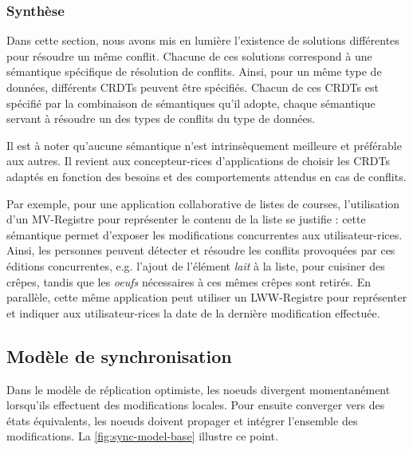 \documentclass[12pt]{thesul}
\newcommand{\eg}{e.g. }
\begin{document}
\subsubsection{Synthèse}

Dans cette section, nous avons mis en lumière l'existence de solutions différentes pour résoudre un même conflit.
Chacune de ces solutions correspond à une sémantique spécifique de résolution de conflits.
Ainsi, pour un même type de données, différents \acp{CRDT} peuvent être spécifiés.
Chacun de ces \acp{CRDT} est spécifié par la combinaison de sémantiques qu'il adopte, chaque sémantique servant à résoudre un des types de conflits du type de données.

Il est à noter qu'aucune sémantique n'est intrinsèquement meilleure et préférable aux autres.
Il revient aux concepteur-rices d'applications de choisir les \acp{CRDT} adaptés en fonction des besoins et des comportements attendus en cas de conflits.

Par exemple, pour une application collaborative de listes de courses, l'utilisation d'un \ac{MV}-Registre pour représenter le contenu de la liste se justifie : cette sémantique permet d'exposer les modifications concurrentes aux utilisateur-rices.
Ainsi, les personnes peuvent détecter et résoudre les conflits provoquées par ces éditions concurrentes, \eg l'ajout de l'élément \emph{lait} à la liste, pour cuisiner des crêpes, tandis que les \emph{oeufs} nécessaires à ces mêmes crêpes sont retirés.
En parallèle, cette même application peut utiliser un \ac{LWW}-Registre pour représenter et indiquer aux utilisateur-rices la date de la dernière modification effectuée.

\subsection{Modèle de synchronisation}

Dans le modèle de réplication optimiste, les noeuds divergent momentanément lorsqu'ils effectuent des modifications locales.
Pour ensuite converger vers des états équivalents, les noeuds doivent propager et intégrer l'ensemble des modifications.
La \autoref{fig:sync-model-base} illustre ce point.
\end{document}

